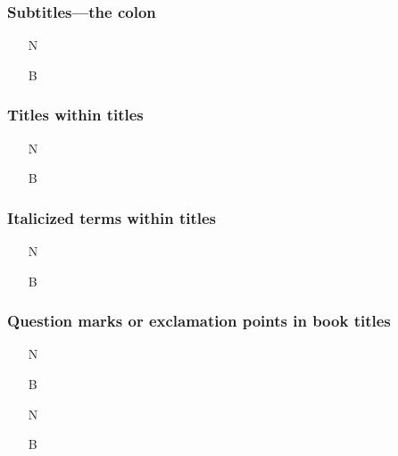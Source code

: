\documentclass[11pt,letterpaper,oneside]{article}
\begin{document}
\setcounter{subsubsection}{96}
\subsubsection{Subtitles---the colon}

\begin{itemize}
\item[N] 

\item[B] 
\end{itemize}


\setcounter{subsubsection}{101}
\subsubsection{Titles within titles}

\begin{itemize}
\item[N] 

\item[B] 
\end{itemize}

\setcounter{subsubsection}{102}
\subsubsection{Italicized terms within titles}

\begin{itemize}
\item[N] 

\item[B] 
\end{itemize}

\setcounter{subsubsection}{104}
\subsubsection{Question marks or exclamation points in book titles}

\begin{itemize}
\item[N] 

\item[B] 

\item[N] 

\item[B] 
\end{itemize}
\end{document}
